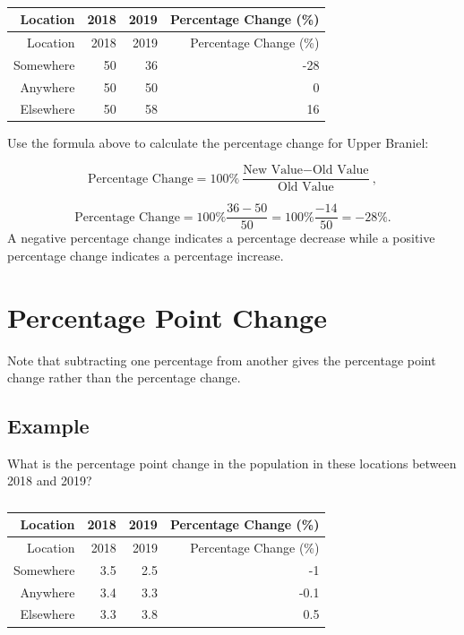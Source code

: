 \documentclass[
]{book}
\begin{document}
\begin{longtable}[]{@{}rrrr@{}}
\caption{\label{tab:table10}}\tabularnewline
\toprule
Location & 2018 & 2019 & Percentage Change (\%) \\
\midrule
\endfirsthead
\toprule
Location & 2018 & 2019 & Percentage Change (\%) \\
\midrule
\endhead
Somewhere & 50 & 36 & -28 \\
Anywhere & 50 & 50 & 0 \\
Elsewhere & 50 & 58 & 16 \\
\bottomrule
\end{longtable}

Use the formula above to calculate the percentage change for Upper Braniel:

\[ \textrm{Percentage Change} = 100\% \frac{\textrm{New Value} - \textrm{Old Value}}{\textrm{Old Value}},\]

\[ \textrm{Percentage Change} = 100\% \frac{36 - 50}{50} = 100\% \frac{-14}{50} = -28\%.\]
A negative percentage change indicates a percentage decrease while a positive percentage change indicates a percentage increase.

\hypertarget{percentage-point-change}{%
\section{Percentage Point Change}\label{percentage-point-change}}

Note that subtracting one percentage from another gives the percentage point change rather than the percentage change.

\hypertarget{example-12}{%
\subsection{Example}\label{example-12}}

What is the percentage point change in the population in these locations between 2018 and 2019?

\begin{longtable}[]{@{}rrrr@{}}
\caption{\label{tab:table11}}\tabularnewline
\toprule
Location & 2018 & 2019 & Percentage Change (\%) \\
\midrule
\endfirsthead
\toprule
Location & 2018 & 2019 & Percentage Change (\%) \\
\midrule
\endhead
Somewhere & 3.5 & 2.5 & -1 \\
Anywhere & 3.4 & 3.3 & -0.1 \\
Elsewhere & 3.3 & 3.8 & 0.5 \\
\bottomrule
\end{longtable}
\end{document}
